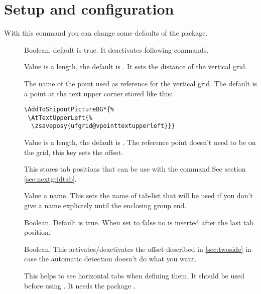 \documentclass[twoside,parskip=half-,fontsize=12pt,egregdoesnotlikesansseriftitles,headings=normal]{scrartcl}
\begin{document}
 

\section{Setup and configuration}\label{sec:setup}

\DescribeMacro{}

With this command you can change some defaults of the package.

\begin{description}
\item[] Boolean, default is true. It deactivates following  commands.

\item[] Value is a length, the default is . It sets the distance of the vertical grid.

\item[] The name of the point used as reference for the vertical grid. The default is a point at the text upper corner stored like this:

\begin{lstlisting}
\AddToShipoutPictureBG*{%
 \AtTextUpperLeft{%
  \zsaveposy{ufgrid@vpointtextupperleft}}}
\end{lstlisting}

\item[] Value is a length, the default is . The reference point doesn't need to be on the grid, this key sets the offset.

\item[] This stores tab positions that can be use with the  command See section \ref{sec:nextgridtab}.

\item[] Value a name. This sets the name of tab-list that will be used if you don't give a name explictely until the enclosing group end.

\item[] Boolean. Default is true. When set to false no \cs{\hfill} is inserted after the last tab position.

\item[] Boolean. This activates/deactivates the offset described in \ref{sec:twoside} in case the automatic detection doesn't do what you want. 

 \item[] This helps to see horizontal tabs when defining them. It should be used before using   . It needs the package .
\end{description}
\end{document}
